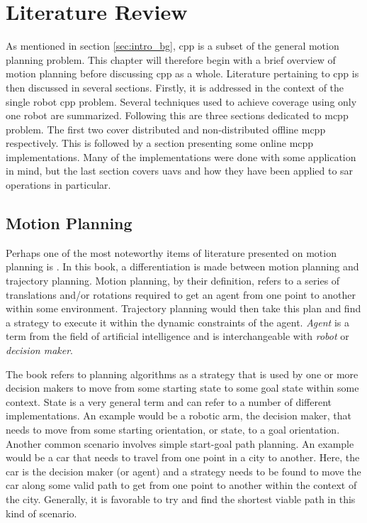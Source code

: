 \chapter{Literature Review}
\label{chp:back}
As mentioned in section \ref{sec:intro_bg}, \acl{cpp} is a subset of the general motion planning problem. This chapter will therefore begin with a brief overview of motion planning before discussing \acs{cpp} as a whole. Literature pertaining to \acs{cpp} is then discussed in several sections. Firstly, it is addressed in the context of the single robot \acs{cpp} problem. Several techniques used to achieve coverage using only one robot are summarized. Following this are three sections dedicated to \acf{mcpp} problem. The first two cover distributed and non-distributed offline \acs{mcpp} respectively. This is followed by a section presenting some online \acs{mcpp} implementations. Many of the implementations were done with some application in mind, but the last section covers \acsp{uav} and how they have been applied to \acs{sar} operations in particular.

\section{Motion Planning}
Perhaps one of the most noteworthy items of literature presented on motion planning is \cite{Lavalle2006}. In this book, a differentiation is made between motion planning and trajectory planning. Motion planning, by their definition, refers to a series of translations and/or rotations required to get an agent from one point to another within some environment. Trajectory planning would then take this plan and find a strategy to execute it within the dynamic constraints of the agent. \emph{Agent} is a term from the field of artificial intelligence and is interchangeable with \emph{robot} or \emph{decision maker}.

The book refers to planning algorithms as a strategy that is used by one or more decision makers to move from some starting state to some goal state within some context. State is a very general term and can refer to a number of different implementations. An example would be a robotic arm, the decision maker, that needs to move from some starting orientation, or state, to a goal orientation. Another common scenario involves simple start-goal path planning. An example would be a car that needs to travel from one point in a city to another. Here, the car is the decision maker (or agent) and a strategy needs to be found to move the car along some valid path to get from one point to another within the context of the city. Generally, it is favorable to try and find the shortest viable path in this kind of scenario.

